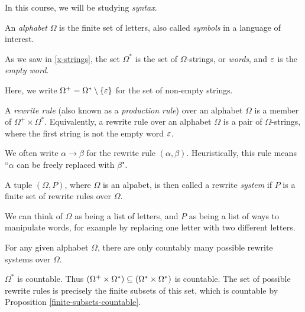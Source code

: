 \documentclass{article}
\begin{document}
\begin{note}
	In this course, we will be studying \textit{syntax}.
\end{note}

\begin{definition}
	An \textit{alphabet} $\Omega$ is the finite set of letters, also called \textit{symbols} in a language of interest.
	
	As we saw in \ref{x-strings}, the set $\Omega^*$ is the set of $\Omega$-strings, or \textit{words}, and $\varepsilon$ is the \textit{empty word}.
	
	Here, we write $\Omega^+ = \Omega^* \setminus \{\varepsilon\}$ for the set of non-empty strings.
\end{definition}

\begin{definition}
	A \textit{rewrite rule} (also known as a \textit{production rule}) over an alphabet $\Omega$ is a member of $\Omega^+ \times \Omega^*$. Equivalently, a rewrite rule over an alphabet $\Omega$ is a pair of $\Omega$-strings, where the first string is not the empty word $\varepsilon$.
		
	We often write $\alpha \to \beta$ for the rewrite rule $(\alpha, \beta)$. Heuristically, this rule means ``$\alpha$ can be freely replaced with $\beta$".
		
	A tuple $(\Omega, P)$, where $\Omega$ is an alpabet, is then called a rewrite \textit{system} if $P$ is a finite set of rewrite rules over $\Omega$.
\end{definition}

\begin{note}
	We can think of $\Omega$ as being a list of letters, and $P$ as being a list of ways to manipulate words, for example by replacing one letter with two different letters.
\end{note}

\begin{proposition}
	\label{countably-many-rewrite-systems}
	For any given alphabet $\Omega$, there are only countably many possible rewrite systems over $\Omega$.
\end{proposition}

\begin{prf}
	$\Omega^*$ is countable. Thus $ (\Omega^+ \times \Omega^*) \subseteq (\Omega^* \times \Omega^*)$ is countable. The set of possible rewrite rules is precisely the finite subsets of this set, which is countable by Proposition \ref{finite-subsets-countable}.
\end{prf}
\end{document}
